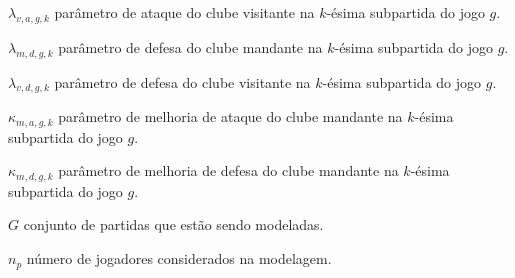\begin{simbolos}
    \item[$\lambda_{v, a, g, k}$] parâmetro de ataque do clube visitante na $k$-ésima subpartida do jogo $g$.
    \item[$\lambda_{m, d, g, k}$] parâmetro de defesa do clube mandante na $k$-ésima subpartida do jogo $g$.
    \item[$\lambda_{v, d, g, k}$] parâmetro de defesa do clube visitante na $k$-ésima subpartida do jogo $g$.
    \item[$\kappa_{m, a, g, k}$] parâmetro de melhoria de ataque do clube mandante na $k$-ésima subpartida do jogo $g$.
    \item[$\kappa_{m, d, g, k}$] parâmetro de melhoria de defesa do clube mandante na $k$-ésima subpartida do jogo $g$.
    \item[$G$] conjunto de partidas que estão sendo modeladas.
    \item[$n_p$] número de jogadores considerados na modelagem.
\end{simbolos}